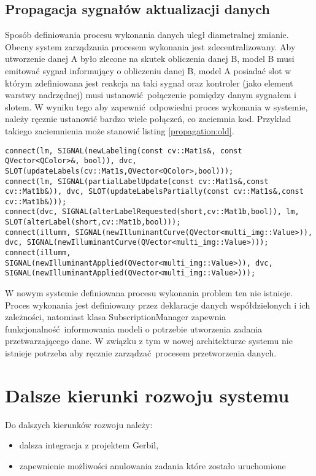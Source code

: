 \subsection{Propagacja sygnałów aktualizacji danych}

Sposób definiowania procesu wykonania danych uległ diametralnej zmianie. Obecny system zarządzania procesem wykonania jest zdecentralizowany. Aby utworzenie danej A było zlecone na skutek obliczenia danej B, model B musi emitować sygnał informujący o obliczeniu danej B, model A posiadać slot w którym zdefiniowana jest reakcja na taki sygnał oraz kontroler (jako element warstwy nadrzędnej) musi ustanowić połączenie pomiędzy danym sygnałem i slotem. W wyniku tego aby zapewnić odpowiedni proces wykonania w systemie, należy ręcznie ustanowić bardzo wiele połączeń, co zaciemnia kod. Przykład takiego zaciemnienia może stanowić listing \ref{propagation:old}.

\begin{minipage}{\textwidth}
	\begin{lstlisting}[label=propagation:old, caption={Przykład definiowania procesu wykonania według starego systemu},alsoletter={()[].=}]
connect(lm, SIGNAL(newLabeling(const cv::Mat1s&, const QVector<QColor>&, bool)), dvc, SLOT(updateLabels(cv::Mat1s,QVector<QColor>,bool)));
connect(lm, SIGNAL(partialLabelUpdate(const cv::Mat1s&,const cv::Mat1b&)), dvc, SLOT(updateLabelsPartially(const cv::Mat1s&,const cv::Mat1b&)));
connect(dvc, SIGNAL(alterLabelRequested(short,cv::Mat1b,bool)), lm, SLOT(alterLabel(short,cv::Mat1b,bool)));
connect(illumm, SIGNAL(newIlluminantCurve(QVector<multi_img::Value>)), dvc, SIGNAL(newIlluminantCurve(QVector<multi_img::Value>)));
connect(illumm, SIGNAL(newIlluminantApplied(QVector<multi_img::Value>)), dvc, SIGNAL(newIlluminantApplied(QVector<multi_img::Value>)));
	\end{lstlisting}
\end{minipage}

W nowym systemie definiowana procesu wykonania problem ten nie istnieje. Proces wykonania jest definiowany przez deklaracje danych współdzielonych i ich zależności, natomiast klasa SubscriptionManager zapewnia funkcjonalność informowania modeli o potrzebie utworzenia zadania przetwarzającego dane. W związku z tym w nowej architekturze systemu nie istnieje potrzeba aby ręcznie zarządzać procesem przetworzenia danych.

\section{Dalsze kierunki rozwoju systemu}
Do dalszych kierunków rozwoju należy:
\begin{itemize}
	\item dalsza integracja z projektem Gerbil,
	\item zapewnienie możliwości anulowania zadania które zostało uruchomione
\end{itemize}
